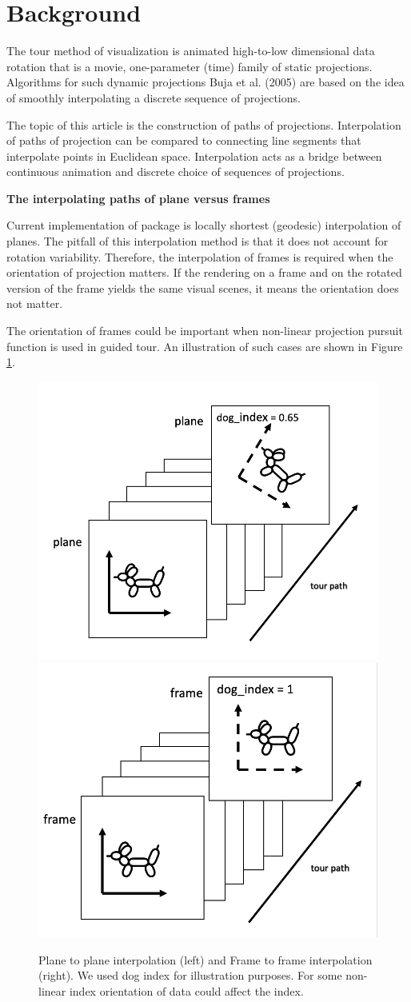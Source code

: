 \hypertarget{background}{%
\section{Background}\label{background}}

The tour method of visualization is animated high-to-low dimensional data rotation that is a movie, one-parameter (time) family of static projections. Algorithms for such dynamic projections Buja et al. (2005) are based on the idea of smoothly interpolating a discrete sequence of projections.

The topic of this article is the construction of paths of projections. Interpolation of paths of projection can be compared to connecting line segments that interpolate points in Euclidean space. Interpolation acts as a bridge between continuous animation and discrete choice of sequences of projections.

\textbf{The interpolating paths of plane versus frames}

Current implementation of  package is locally shortest (geodesic) interpolation of planes. The pitfall of this interpolation method is that it does not account for rotation variability. Therefore, the interpolation of frames is required when the orientation of projection matters. If the rendering on a frame and on the rotated version of the frame yields the same visual scenes, it means the orientation does not matter.

The orientation of frames could be important when non-linear projection pursuit function is used in guided tour. An illustration of such cases are shown in Figure \ref{fig:dogs}.

\begin{figure}

{\centering \includegraphics[width=0.45\linewidth]{plane} \includegraphics[width=0.45\linewidth]{frame} 

}

\caption{Plane to plane interpolation (left) and Frame to frame interpolation (right). We used dog index for illustration purposes. For some non-linear index orientation of data could affect the index.}\label{fig:dogs}
\end{figure}

